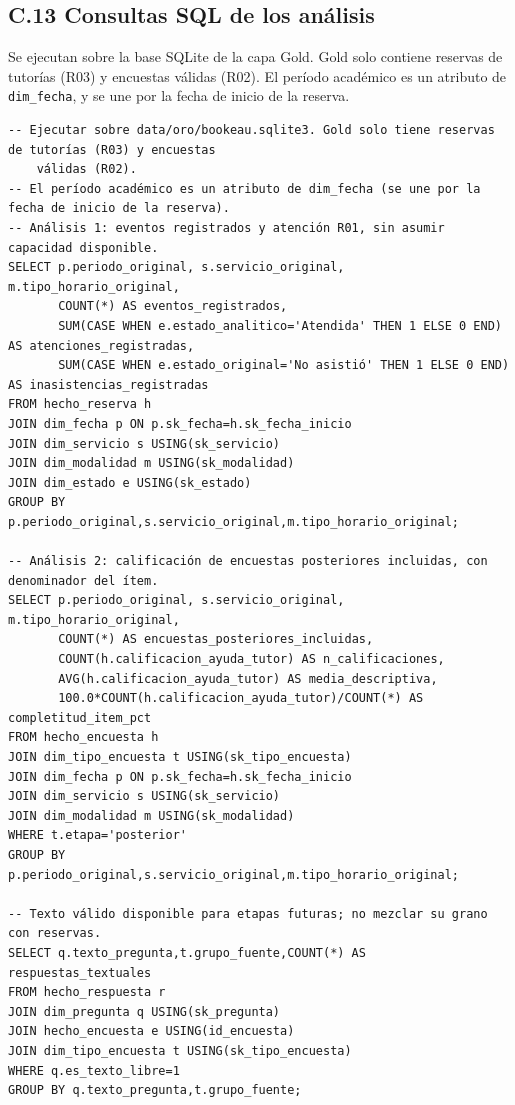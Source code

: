 \documentclass[11pt,letterpaper]{article}
\begin{document}
\subsection*{C.13 Consultas SQL de los análisis}

Se ejecutan sobre la base SQLite de la capa Gold. Gold solo contiene reservas de tutorías (R03) y encuestas válidas (R02). El período académico es un atributo de \texttt{dim\_\allowbreak{}fecha}, y se une por la fecha de inicio de la reserva.

\begingroup\footnotesize\begin{verbatim}
-- Ejecutar sobre data/oro/bookeau.sqlite3. Gold solo tiene reservas de tutorías (R03) y encuestas 
    válidas (R02).
-- El período académico es un atributo de dim_fecha (se une por la fecha de inicio de la reserva).
-- Análisis 1: eventos registrados y atención R01, sin asumir capacidad disponible.
SELECT p.periodo_original, s.servicio_original, m.tipo_horario_original,
       COUNT(*) AS eventos_registrados,
       SUM(CASE WHEN e.estado_analitico='Atendida' THEN 1 ELSE 0 END) AS atenciones_registradas,
       SUM(CASE WHEN e.estado_original='No asistió' THEN 1 ELSE 0 END) AS inasistencias_registradas
FROM hecho_reserva h
JOIN dim_fecha p ON p.sk_fecha=h.sk_fecha_inicio
JOIN dim_servicio s USING(sk_servicio)
JOIN dim_modalidad m USING(sk_modalidad)
JOIN dim_estado e USING(sk_estado)
GROUP BY p.periodo_original,s.servicio_original,m.tipo_horario_original;

-- Análisis 2: calificación de encuestas posteriores incluidas, con denominador del ítem.
SELECT p.periodo_original, s.servicio_original, m.tipo_horario_original,
       COUNT(*) AS encuestas_posteriores_incluidas,
       COUNT(h.calificacion_ayuda_tutor) AS n_calificaciones,
       AVG(h.calificacion_ayuda_tutor) AS media_descriptiva,
       100.0*COUNT(h.calificacion_ayuda_tutor)/COUNT(*) AS completitud_item_pct
FROM hecho_encuesta h
JOIN dim_tipo_encuesta t USING(sk_tipo_encuesta)
JOIN dim_fecha p ON p.sk_fecha=h.sk_fecha_inicio
JOIN dim_servicio s USING(sk_servicio)
JOIN dim_modalidad m USING(sk_modalidad)
WHERE t.etapa='posterior'
GROUP BY p.periodo_original,s.servicio_original,m.tipo_horario_original;

-- Texto válido disponible para etapas futuras; no mezclar su grano con reservas.
SELECT q.texto_pregunta,t.grupo_fuente,COUNT(*) AS respuestas_textuales
FROM hecho_respuesta r
JOIN dim_pregunta q USING(sk_pregunta)
JOIN hecho_encuesta e USING(id_encuesta)
JOIN dim_tipo_encuesta t USING(sk_tipo_encuesta)
WHERE q.es_texto_libre=1
GROUP BY q.texto_pregunta,t.grupo_fuente;


\end{verbatim}
\end{document}
